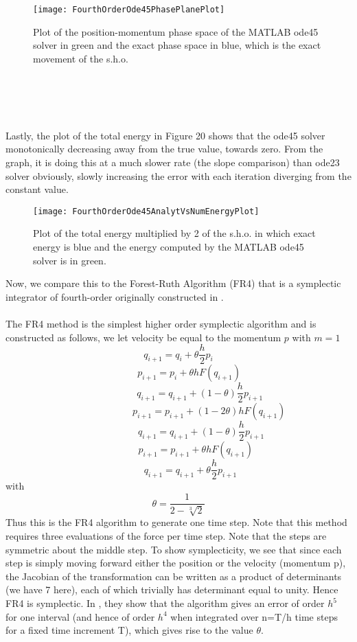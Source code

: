 \documentclass[12pt]{article}
\begin{document}
\begin{figure}[h!]
\centering
\texttt{[image: FourthOrderOde45PhasePlanePlot]}
\caption{Plot of the position-momentum phase space of the MATLAB ode45 solver in green and the exact phase space in blue, which is the exact movement of the s.h.o.}
\end{figure}
\\\\\\\\\indent Lastly, the plot of the total energy in Figure 20 shows that the ode45 solver monotonically decreasing away from the true value, towards zero. From the graph, it is doing this at a much slower rate (the slope comparison) than ode23 solver obviously, slowly increasing the error with each iteration diverging from the constant value. 
\begin{figure}[ht]
\centering
\texttt{[image: FourthOrderOde45AnalytVsNumEnergyPlot]}
\caption{Plot of the total energy multiplied by 2 of the s.h.o. in which exact energy is blue and the energy computed by the MATLAB ode45 solver is in green.}
\end{figure}
Now, we compare this to the Forest-Ruth Algorithm (FR4) that is a symplectic integrator of fourth-order originally constructed in \cite{ER}. \\
\\\indent The FR4 method is the simplest higher order symplectic algorithm and is constructed as follows, we let velocity be equal to the momentum $p$ with $m=1$
\[q_{i+1}=q_{i}+\theta \frac{h}{2}p_i\]
\[\;\;\;\;\;\;\;\;p_{i+1}=p_{i}+\theta hF(q_{i+1})\]
\[\;\;\;\;\;\;\;\;\;\;\;\;\;\;\;\;q_{i+1}=q_{i+1}+(1-\theta) \frac{h}{2}p_{i+1}\]
\[\;\;\;\;\;\;\;\;\;\;\;\;\;\;\;\;\;\;\;\;\;\;\;p_{i+1}=p_{i+1}+(1-2\theta) hF(q_{i+1})\]
\[\;\;\;\;\;\;\;\;\;\;\;\;\;\;\;\;\;q_{i+1}=q_{i+1}+(1-\theta) \frac{h}{2}p_{i+1}\]
\[\;\;\;\;\;\;\;\;\;\;\;\;\;p_{i+1}=p_{i+1}+\theta hF(q_{i+1})\]
\[\;\;\;\;\;\;\;\;\;q_{i+1}=q_{i+1}+\theta \frac{h}{2}p_{i+1}\]
with 
\[\theta=\frac{1}{{2-\sqrt[3]{2}}}\]
Thus this is the FR4 algorithm to generate one time step. Note that this method requires three evaluations of the force per time step. Note that the steps are symmetric about the middle step. To show symplecticity, we see that since each step is simply moving forward either the position or the velocity (momentum p), the Jacobian of the transformation can be written as a product of determinants (we have 7 here), each of which trivially has determinant equal to unity. Hence FR4 is symplectic. In \cite{ER}, they show that the algorithm gives an error of order ${h}^{5}$ for one interval (and hence of order ${h}^{4}$ when integrated over n=T/h time steps for a fixed time increment T), which gives rise to the value $\theta$. \\
\end{document}
